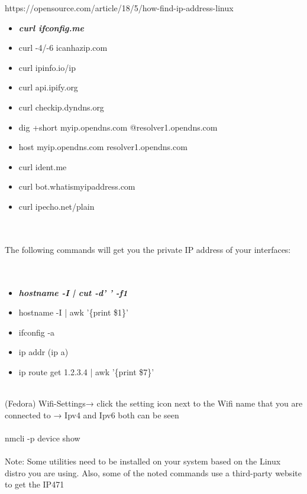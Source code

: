 \documentclass[10pt,a4paper]{article}
\begin{document}
{{{{{{{{{{{{{{{{\large https://opensource.com/article/18/5/how-find-ip-address-linux}{\large }
\begin{itemize}
\item \textbf{\textit{{\Large curl ifconfig.me}}}
\end{itemize}
{\large }
\begin{itemize}
\item {\large curl -4/-6 icanhazip.com}
\item {\large curl ipinfo.io/ip}
\item {\large curl api.ipify.org}
\item {\large curl checkip.dyndns.org}
\item {\large dig +short myip.opendns.com @resolver1.opendns.com}
\item {\large host myip.opendns.com resolver1.opendns.com}
\item {\large curl ident.me}
\item {\large curl bot.whatismyipaddress.com}
\item {\large curl ipecho.net/plain}
\end{itemize}
{\Large \\
\\
The following commands will get you the private IP address of your interfaces:\\
\\
\\
}
\begin{itemize}
\item \textbf{\textit{{\Large hostname -I | cut -d' ' -f1}}}
\end{itemize}
{\large }
\begin{itemize}
\item {\large hostname -I | awk '\{print \$1\}'}
\item {\large ifconfig -a}
\item {\large ip addr (ip a)}
\item {\large ip route get 1.2.3.4 | awk '\{print \$7\}'}
\end{itemize}
{\large \\
(Fedora) Wifi-Settings→ click the setting icon next to the Wifi name that you are connected to → Ipv4 and Ipv6 both can be seen\\
\\
    nmcli -p device show\\
\\
Note: Some utilities need to be installed on your system based on the Linux distro you are using. Also, some of the noted commands use a third-party website to get the IP}471
}}}}}}}}}}}}}}}
\end{document}
